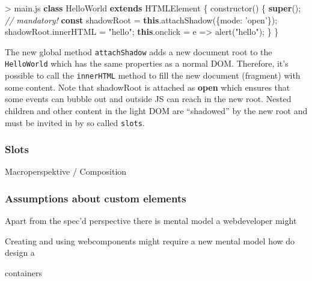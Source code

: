 \documentclass[]{assets/latex/ieee}
\newenvironment{Shaded}{}{}
\newcommand{\KeywordTok}[1]{\textcolor[rgb]{0.00,0.44,0.13}{\textbf{{#1}}}}
\newcommand{\DataTypeTok}[1]{\textcolor[rgb]{0.56,0.13,0.00}{{#1}}}
\newcommand{\StringTok}[1]{\textcolor[rgb]{0.25,0.44,0.63}{{#1}}}
\newcommand{\CommentTok}[1]{\textcolor[rgb]{0.38,0.63,0.69}{\textit{{#1}}}}
\newcommand{\VariableTok}[1]{\textcolor[rgb]{0.10,0.09,0.49}{{#1}}}
\newcommand{\OperatorTok}[1]{\textcolor[rgb]{0.40,0.40,0.40}{{#1}}}
\newcommand{\AttributeTok}[1]{\textcolor[rgb]{0.49,0.56,0.16}{{#1}}}
\newcommand{\NormalTok}[1]{{#1}}
\begin{document}
\begin{Shaded}
\begin{Highlighting}[]
\OperatorTok{>} \VariableTok{main}\NormalTok{.}\AttributeTok{js}
\KeywordTok{class} \NormalTok{HelloWorld }\KeywordTok{extends} \NormalTok{HTMLElement }\OperatorTok{\{}
  \AttributeTok{constructor}\NormalTok{() }\OperatorTok{\{}
    \KeywordTok{super}\NormalTok{()}\OperatorTok{;} \CommentTok{// mandatory!}
    \KeywordTok{const} \NormalTok{shadowRoot }\OperatorTok{=}
          \KeywordTok{this}\NormalTok{.}\AttributeTok{attachShadow}\NormalTok{(}\OperatorTok{\{}\DataTypeTok{mode}\OperatorTok{:} \StringTok{'open'}\OperatorTok{\}}\NormalTok{)}\OperatorTok{;}
    \VariableTok{shadowRoot}\NormalTok{.}\AttributeTok{innerHTML} \OperatorTok{=} \StringTok{"hello"}\OperatorTok{;}
    \KeywordTok{this}\NormalTok{.}\AttributeTok{onclick} \OperatorTok{=} \NormalTok{e }\OperatorTok{=>} \AttributeTok{alert}\NormalTok{(}\StringTok{"hello"}\NormalTok{)}\OperatorTok{;}
  \OperatorTok{\}}
\OperatorTok{\}}
\end{Highlighting}
\end{Shaded}

The new global method \texttt{attachShadow} adds a new document root to
the \texttt{HelloWorld} which has the same properties as a normal DOM.
Therefore, it's possible to call the \texttt{innerHTML} method to fill
the new document (fragment) with some content. Note that shadowRoot is
attached as \textbf{open} which ensures that some events can bubble out
and outside JS can reach in the new root. Nested children and other
content in the light DOM are ``shadowed'' by the new root and must be
invited in by so called \texttt{slots}.

\subsubsection{Slots}\label{slots}

Macroperspektive / Composition

\subsubsection{Assumptions about custom
elements}\label{assumptions-about-custom-elements}

Apart from the spec'd perspective there is mental model a webdeveloper
might

Creating and using webcomponents might require a new mental model how do
design a

containers
\end{document}
